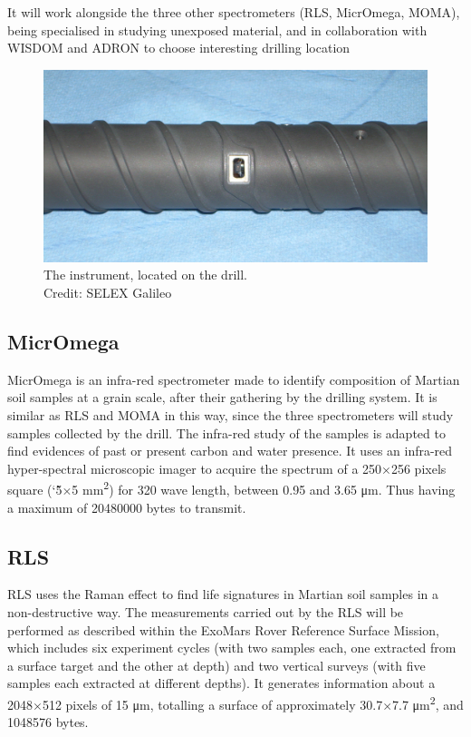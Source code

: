 \documentclass[12pt,a4paper]{article}
\begin{document}
It will work alongside the three other spectrometers (RLS, MicrOmega, MOMA), being specialised in studying unexposed material, and in collaboration with WISDOM and ADRON to choose interesting drilling location

\begin{figure}[h]
\centering
\includegraphics[scale=.7]{pictures/MaMiss}
\caption{The instrument, located on the drill.\\Credit: SELEX Galileo}
\end{figure}

\subsection{MicrOmega}

MicrOmega is an infra-red spectrometer made to identify composition of Martian soil samples at a grain scale, after their gathering by the drilling system. It is similar as RLS and MOMA in this way, since the three spectrometers will study samples collected by the drill. The infra-red study of the samples is adapted to find evidences of past or present carbon and water presence. 
It uses an infra-red hyper-spectral microscopic imager to acquire the spectrum of a 250$\times$256 pixels square (\char`\~5$\times$5 \si{\milli\metre^2}) for 320 wave length, between 0.95 and 3.65 \si{\micro\metre}. Thus having a maximum of \num{20480000} bytes to transmit.

\subsection{RLS}
RLS uses the Raman effect to find life signatures in Martian soil samples in a non-destructive way.
The measurements carried out by the RLS will be performed as described within the ExoMars Rover Reference Surface Mission, which includes six experiment cycles (with two samples each, one extracted from a surface target and the other at depth) and two vertical surveys (with five samples each extracted at different depths). It generates information about a 2048$\times$512 pixels of 15 \si{\micro\metre}, totalling a surface of approximately 30.7$\times$7.7 \si{\micro\metre^2}, and \num{1048576} bytes.
\end{document}
